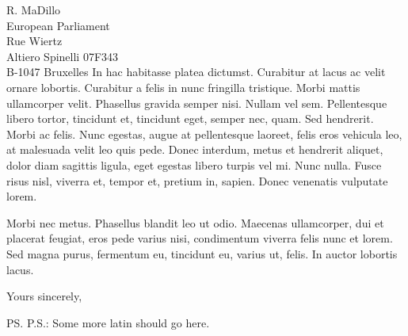 \documentclass[a4paper,10pt]{letter}
\begin{document}
\begin{letter}{
    R. MaDillo\\
    European Parliament\\
    Rue Wiertz\\
    Altiero Spinelli 07F343\\
    B-1047 Bruxelles 
  }
  In hac habitasse platea dictumst. Curabitur at lacus ac velit ornare lobortis. 
  Curabitur a felis in nunc fringilla tristique. Morbi mattis ullamcorper velit. 
  Phasellus gravida semper nisi. Nullam vel sem. Pellentesque libero tortor, 
  tincidunt et, tincidunt eget, semper nec, quam. Sed hendrerit. Morbi ac felis. 
  Nunc egestas, augue at pellentesque laoreet, felis eros vehicula leo, at 
  malesuada velit leo quis pede. Donec interdum, metus et hendrerit aliquet, 
  dolor diam sagittis ligula, eget egestas libero turpis vel mi. Nunc nulla. 
  Fusce risus nisl, viverra et, tempor et, pretium in, sapien. Donec venenatis 
  vulputate lorem.

  Morbi nec metus. Phasellus blandit leo ut odio. Maecenas ullamcorper, dui et 
  placerat feugiat, eros pede varius nisi, condimentum viverra felis nunc et 
  lorem. Sed magna purus, fermentum eu, tincidunt eu, varius ut, felis. In 
  auctor lobortis lacus.  
%
  \closing{Yours sincerely,}
%
  \ps{P.S.: Some more latin should go here.}
\end{letter}
\end{document}
